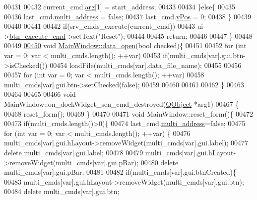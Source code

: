 \begin{DoxyCode}
00431 
00432           current\_cmd.\hyperlink{a00004_a56e6c2d7315d0ae60a51e8b140c9cfe4}{arg}[1] = start\_address;
00433 
00434      \}\textcolor{keywordflow}{else}\{
00435 
00436         last\_cmd.\hyperlink{a00004_a8e69b971c61ced27a7567efd2bf0db59}{multi\_address} = \textcolor{keyword}{false};
00437         last\_cmd.\hyperlink{a00004_a2b48b371fd84be2a8ad581b1ad708b88}{vPos} = 0;
00438      \}
00439 
00440 
00441 
00442        \textcolor{keywordflow}{if}(srv\_cmds\_execute(current\_cmd))
00443           ui->\hyperlink{a00080_a9ea50d44e38316e4203933698cbc14a6}{btn\_execute\_cmd}->setText(\textcolor{stringliteral}{"Reset"});
00444 
00445     \textcolor{keywordflow}{return};
00446 
00447 \}
00448 
00449 
\hypertarget{a00134_source_l00450}{}\hyperlink{a00017_a35b895072769864ac42f8cd732267e4b}{00450} \textcolor{keywordtype}{void} \hyperlink{a00017_a35b895072769864ac42f8cd732267e4b}{MainWindow::data\_open}(\textcolor{keywordtype}{bool} checked)\{
00451 
00452     \textcolor{keywordflow}{for} (\textcolor{keywordtype}{int} var = 0; var < multi\_cmds.length(); ++var)
00453         \textcolor{keywordflow}{if}(multi\_cmds[var].gui.btn->isChecked())
00454             loadFile(multi\_cmds[var].data\_file\_name);
00455 
00456 
00457     \textcolor{keywordflow}{for} (\textcolor{keywordtype}{int} var = 0; var < multi\_cmds.length(); ++var)
00458         multi\_cmds[var].gui.btn->setChecked(\textcolor{keyword}{false});
00459 
00460 
00461 
00462 \}
00463 
00464 
00465 
00466 \textcolor{keywordtype}{void} MainWindow::on\_dockWidget\_sen\_cmd\_destroyed(\hyperlink{a00059}{QObject} *arg1)
00467 \{
00468   reset\_form();
00469 \}
00470 
00471 \textcolor{keywordtype}{void} MainWindow::reset\_form()\{
00472 
00473     \textcolor{keywordflow}{if}(multi\_cmds.length()>0)\{
00474         last\_cmd.\hyperlink{a00004_a8e69b971c61ced27a7567efd2bf0db59}{multi\_address}=\textcolor{keyword}{false};
00475         \textcolor{keywordflow}{for} (\textcolor{keywordtype}{int} var = 0; var < multi\_cmds.length(); ++var) \{
00476             multi\_cmds[var].gui.hLayout->removeWidget(multi\_cmds[var].gui.label);
00477             \textcolor{keyword}{delete} multi\_cmds[var].gui.label;
00478 
00479             multi\_cmds[var].gui.hLayout->removeWidget(multi\_cmds[var].gui.pBar);
00480             \textcolor{keyword}{delete} multi\_cmds[var].gui.pBar;
00481 
00482             \textcolor{keywordflow}{if}(multi\_cmds[var].gui.btnCreated)\{
00483             multi\_cmds[var].gui.hLayout->removeWidget(multi\_cmds[var].gui.btn);
00484             \textcolor{keyword}{delete} multi\_cmds[var].gui.btn;

\end{DoxyCode}
